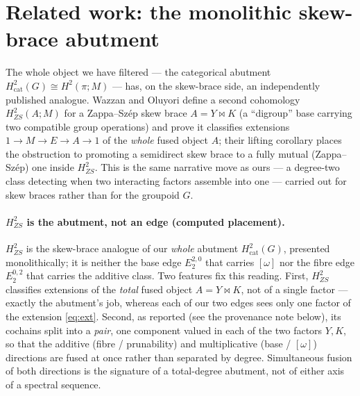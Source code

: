\documentclass[11pt]{article}
\theoremstyle{definition}
\begin{document}
\section{Related work: the monolithic skew-brace abutment}\label{sec:related}

The whole object we have filtered --- the categorical abutment
$H^2_{\mathrm{cat}}(G)\cong H^2(\pi;M)$ --- has, on the skew-brace side, an independently
published analogue. Wazzan and Oluyori \cite{oluyori} define a second cohomology
$H^2_{ZS}(A;M)$ for a Zappa--Sz\'ep skew brace $A=Y\bowtie K$ (a ``digroup'' base carrying
two compatible group operations) and prove it classifies extensions
$1\to M\to E\to A\to1$ of the \emph{whole} fused object $A$; their lifting corollary places
the obstruction to promoting a semidirect skew brace to a fully mutual (Zappa--Sz\'ep) one
inside $H^2_{ZS}$. This is the same narrative move as ours --- a degree-two class detecting
when two interacting factors assemble into one --- carried out for skew braces rather than
for the groupoid $G$.

\paragraph{$H^2_{ZS}$ is the abutment, not an edge (computed placement).} $H^2_{ZS}$ is the
skew-brace analogue of our \emph{whole} abutment $H^2_{\mathrm{cat}}(G)$, presented
monolithically; it is neither the base edge $E_2^{2,0}$ that carries $[\omega]$ nor the
fibre edge $E_2^{0,2}$ that carries the additive class. Two features fix this reading. First,
$H^2_{ZS}$ classifies extensions of the \emph{total} fused object $A=Y\bowtie K$, not of a
single factor --- exactly the abutment's job, whereas each of our two edges sees only one
factor of the extension \eqref{eq:ext}. Second, as reported (see the provenance note below),
its cochains split into a \emph{pair}, one component valued in each of the two factors
$Y,K$, so that the additive (fibre / prunability) and multiplicative (base / $[\omega]$)
directions are fused at once rather than separated by degree. Simultaneous fusion of both
directions is the signature of a total-degree abutment, not of either axis of a spectral
sequence.
\end{document}
